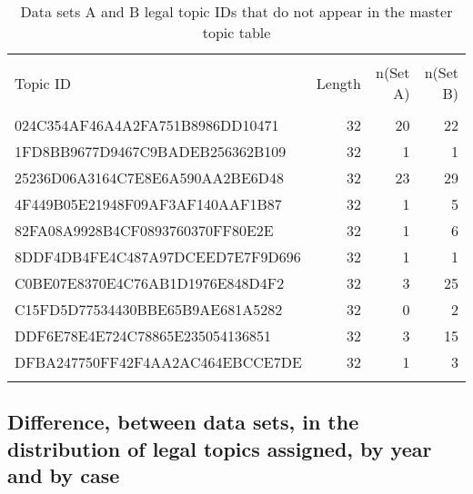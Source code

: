 \documentclass[10pt, letterpaper]{article}
\begin{document}
\begin{spacing}{1.0}
\begin{table}[H]
    \centering
    \caption{Data sets A and B legal topic IDs that do not appear in the master topic table}
    \begin{tabular}{lrrr}
        \hline\\[-6pt]
        Topic ID & Length & n(Set A) & n(Set B)\\[2pt]
        \hline\\[-6pt]
        024C354AF46A4A2FA751B8986DD10471 & 32 & 20 & 22\\
        1FD8BB9677D9467C9BADEB256362B109 & 32 & 1 & 1\\
        25236D06A3164C7E8E6A590AA2BE6D48 & 32 & 23 & 29\\
        4F449B05E21948F09AF3AF140AAF1B87 & 32 & 1 & 5\\
        82FA08A9928B4CF0893760370FF80E2E & 32 & 1 & 6\\
        8DDF4DB4FE4C487A97DCEED7E7F9D696 & 32 & 1 & 1\\
        C0BE07E8370E4C76AB1D1976E848D4F2 & 32 & 3 & 25\\
        C15FD5D77534430BBE65B9AE681A5282 & 32 & 0 & 2\\
        DDF6E78E4E724C78865E235054136851 & 32 & 3 & 15\\
        DFBA247750FF42F4AA2AC464EBCCE7DE & 32 & 1 & 3\\[4pt]
        \hline\\[-4pt]
\end{tabular}
\label{tab:UnknownTopicID}
\end{table}

\clearpage


\subsection{Difference, between data sets, in the distribution of legal topics assigned, by year and by case}


\end{spacing}
\end{document}
